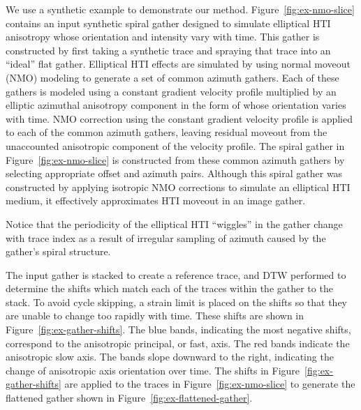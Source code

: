 We use a synthetic example to demonstrate our method.  Figure~\ref{fig:ex-nmo-slice} contains an input synthetic spiral gather designed to simulate elliptical HTI anisotropy whose orientation and intensity vary with time. This gather is constructed by first taking a synthetic trace and spraying that trace into an ``ideal'' flat gather. Elliptical HTI effects are simulated by using normal moveout (NMO) modeling to generate a set of common azimuth gathers.  Each of these gathers is modeled using  a constant gradient velocity profile multiplied by an elliptic azimuthal anisotropy component in the form of \cite{mallick-1997} whose orientation varies with time.  NMO correction using the constant gradient velocity profile is applied to each of the common azimuth gathers, leaving residual moveout from the unaccounted anisotropic component of the velocity profile.  The spiral gather in Figure~\ref{fig:ex-nmo-slice} is constructed from these common azimuth gathers by selecting appropriate offset and azimuth pairs.  Although this spiral gather was constructed by applying isotropic NMO corrections to simulate an elliptical HTI medium, it effectively approximates HTI moveout in an image gather.


Notice that the periodicity of the elliptical HTI ``wiggles'' in the gather change with trace index as a result of irregular sampling of azimuth caused by the gather's spiral structure.

The input gather is stacked to create a reference trace, and DTW performed to determine the shifts which match each of the traces within the gather to the stack.  To avoid cycle skipping, a strain limit is placed on the shifts so that they are unable to change too rapidly with time.  These shifts are shown in Figure~\ref{fig:ex-gather-shifts}.  The blue bands, indicating the most negative shifts, correspond to the anisotropic principal, or fast, axis.  The red bands indicate the anisotropic slow axis.  The bands slope downward to the right, indicating the change of anisotropic axis orientation over time.  The shifts in Figure~\ref{fig:ex-gather-shifts} are applied to the traces in Figure~\ref{fig:ex-nmo-slice} to generate the flattened gather shown in Figure~\ref{fig:ex-flattened-gather}.



